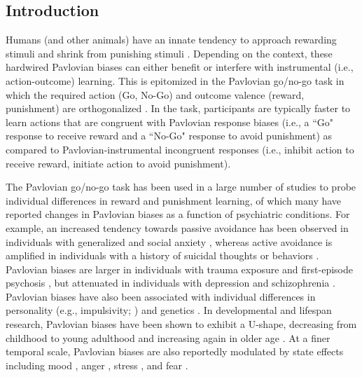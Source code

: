 \documentclass[a4paper,12pt]{article}
\begin{document}
\break
\setlength{\parindent}{0em}    %
\setlength{\parskip}{1em}      %
\begin{refsection}[main]       %

\section*{Introduction}

Humans (and other animals) have an innate tendency to approach rewarding stimuli and shrink from punishing stimuli \cite{carver1994behavioral}. Depending on the context, these hardwired Pavlovian biases can either benefit or interfere with instrumental (i.e., action-outcome) learning. This is epitomized in the Pavlovian go/no-go task in which the required action (Go, No-Go) and outcome valence (reward, punishment) are orthogonalized \cite{guitart2012go, guitart2014action}. In the task, participants are typically faster to learn actions that are congruent with Pavlovian response biases (i.e., a ``Go" response to receive reward and a ``No-Go" response to avoid punishment) as compared to Pavlovian-instrumental incongruent responses (i.e., inhibit action to receive reward, initiate action to avoid punishment). 

The Pavlovian go/no-go task has been used in a large number of studies to probe individual differences in reward and punishment learning, of which many have reported changes in Pavlovian biases as a function of psychiatric conditions. For example, an increased tendency towards passive avoidance has been observed in individuals with generalized and social anxiety \cite{mkrtchian2017modeling, peterburs2021impact}, whereas active avoidance is amplified in individuals with a history of suicidal thoughts or behaviors \cite{millner2019suicidal}. Pavlovian biases are larger in individuals with trauma exposure \cite{ousdal2018impact} and first-episode psychosis \cite{montagnese2020reinforcement}, but attenuated in individuals with depression \cite{huys2016specificity} and schizophrenia \cite{albrecht2016reduction}. Pavlovian biases have also been associated with individual differences in personality (e.g., impulsivity; \cite{eisinger2020pavlovian}) and genetics \cite{richter2014valenced, richter2021motivational}. In developmental and lifespan research, Pavlovian biases have been shown to exhibit a U-shape, decreasing from childhood to young adulthood and increasing again in older age \cite{raab2020adolescents, betts2020learning}. At a finer temporal scale, Pavlovian biases are also reportedly modulated by state effects including mood \cite{weber2022effects}, anger \cite{wonderlich2020anger}, stress \cite{de2016acute}, and fear \cite{mkrtchian2017threat}. 


\end{refsection}
\end{document}
